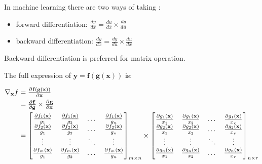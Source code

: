 \begin{definition}     
In machine learning there are two ways of taking :
\begin{itemize}
	\item forward differentiation: $\frac{dy}{dx} =\frac{du}{dx} \times \frac{dy}{du}$
	\item backward differentiation: $\frac{dy}{dx}=\frac{dy}{du} \times \frac{du}{dx}$
\end{itemize}

Backward differentiation is preferred for matrix operation.



The full expression of $\mathbf{y}=\mathbf{f}(\mathbf{g}(\mathbf{x}))$ is:

\begin{equation}
\begin{aligned}
	\nabla{}_{\mathbf{x}} f &=  \pd{\mathbf{f}(\mathbf{g}(\mathbf{x}))}{\mathbf{x}} \\
	&= \pd{\mathbf{f}}{\mathbf{g}} \times \pd{\mathbf{g}}{\mathbf{x}} \\
	&= \mleft [ \begin{matrix}
\frac{\partial f_1({\mathbf{x}})}{g_1} & \frac{\partial f_1({\mathbf{x}})}{g_2} & \dots & \frac{\partial f_1({\mathbf{x}})}{g_n} \\
\frac{\partial f_2({\mathbf{x}})}{g_1} & \frac{\partial f_2({\mathbf{x}})}{g_2} & \dots & \frac{\partial f_2({\mathbf{x}})}{g_n} \\
\vdots & \vdots & \ddots & \vdots  \\
\frac{\partial f_m({\mathbf{x}})}{g_1} & \frac{\partial f_m({\mathbf{x}})}{g_2} & \dots & \frac{\partial f_m({\mathbf{x}})}{g_n}
\end{matrix} \mright ]_{m \times n}
\times %
\mleft [ \begin{matrix}
\frac{\partial g_1({\mathbf{x}})}{x_1} & \frac{\partial g_1({\mathbf{x}})}{x_2} & \dots & \frac{\partial g_1({\mathbf{x}})}{x_r} \\
\frac{\partial g_2({\mathbf{x}})}{x_1} & \frac{\partial g_2({\mathbf{x}})}{x_2} & \dots & \frac{\partial g_2({\mathbf{x}})}{x_r} \\
\vdots & \vdots & \ddots & \vdots  \\
\frac{\partial g_n({\mathbf{x}})}{x_1} & \frac{\partial g_n({\mathbf{x}})}{x_2} & \dots & \frac{\partial g_n({\mathbf{x}})}{x_r}
\end{matrix} \mright ]_{n \times r}
\end{aligned}
\end{equation}
\end{definition}



